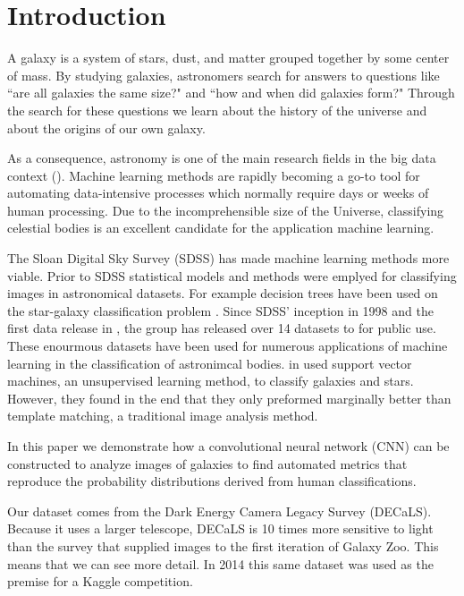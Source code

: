 \section{Introduction}


A galaxy is a system of stars, dust, and matter grouped together by some center of mass. By studying galaxies, astronomers search for answers to questions like ``are all galaxies the same size?" and ``how and when did galaxies form?" Through the search for these questions we learn about the history of the universe and about the origins of our own galaxy.


As a consequence, astronomy is one of the main research fields in the big data context (\citeauthor{microsoft-galaxies}). Machine learning methods are rapidly becoming a go-to tool for automating data-intensive processes which normally require days or weeks of human processing. Due to the incomprehensible size of the Universe, classifying celestial bodies is an excellent candidate for the application machine learning.

The Sloan Digital Sky Survey (SDSS) has made machine learning methods more viable. Prior to SDSS statistical models and methods were emplyed for classifying images in astronomical datasets. For example decision trees have been used on the star-galaxy classification problem \cite{ball-decision-trees}. Since SDSS' inception in 1998 and the first data release in \citeyear{sdss-segue-1}, the group has released over 14 datasets to for public use. These enourmous datasets have been used for numerous applications of machine learning in the classification of astronimcal bodies. \citeauthor{svn-galaxy} in \citeyear{svn-galaxy} used support vector machines, an unsupervised learning method, to classify galaxies and stars. However, they found in the end that they only preformed marginally better than template matching, a traditional image analysis method. \cite{svn-galaxy}

In this paper we demonstrate how a convolutional neural network (CNN) can be constructed to analyze images of galaxies to find automated metrics that reproduce the probability distributions derived from human classifications.

Our dataset comes from the Dark Energy Camera Legacy Survey (DECaLS). Because it uses a larger telescope, DECaLS is 10 times more sensitive to light than the survey that supplied images to the first iteration of Galaxy Zoo. This means that we can see more detail. \cite{zooniverse} In 2014 this same dataset was used as the premise for a Kaggle competition.

